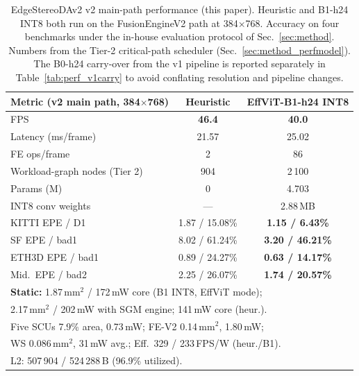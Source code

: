 \documentclass[journal]{IEEEtran}
\begin{document}
\begin{table}[tb]
\caption{EdgeStereoDAv2 v2 main-path performance (this paper). Heuristic and B1-h24 INT8 both run on the FusionEngineV2 path at 384$\times$768. Accuracy on four benchmarks under the in-house evaluation protocol of Sec.~\ref{sec:method}. Numbers from the Tier-2 critical-path scheduler (Sec.~\ref{sec:method_perfmodel}). The B0-h24 carry-over from the v1 pipeline is reported separately in Table~\ref{tab:perf_v1carry} to avoid conflating resolution and pipeline changes.}
\label{tab:perf}
\centering
\scriptsize
\setlength{\tabcolsep}{3pt}
\begin{tabular}{|l|c|c|}
\hline
\textbf{Metric (v2 main path, 384$\times$768)} & \textbf{Heuristic} & \textbf{EffViT-B1-h24 INT8} \\
\hline
FPS                 & \textbf{46.4}  & \textbf{40.0} \\
Latency (ms/frame)  & 21.57          & 25.02 \\
FE ops/frame        & 2              & 86 \\
Workload-graph nodes (Tier 2) & 904   & 2\,100 \\
Params (M)          & 0              & 4.703 \\
INT8 conv weights   & ---            & 2.88\,MB \\
\hline
KITTI EPE / D1      & 1.87 / 15.08\% & \textbf{1.15 / 6.43\%} \\
SF EPE / bad1       & 8.02 / 61.24\% & \textbf{3.20 / 46.21\%} \\
ETH3D EPE / bad1    & 0.89 / 24.27\% & \textbf{0.63 / 14.17\%} \\
Mid.\ EPE / bad2    & 2.25 / 26.07\% & \textbf{1.74 / 20.57\%} \\
\hline
\multicolumn{3}{|l|}{\textbf{Static:} 1.87\,mm$^2$ / 172\,mW core (B1 INT8, EffViT mode);} \\
\multicolumn{3}{|l|}{2.17\,mm$^2$ / 202\,mW with SGM engine; 141\,mW core (heur.).} \\
\multicolumn{3}{|l|}{Five SCUs 7.9\% area, 0.73\,mW; FE-V2 0.14\,mm$^2$, 1.80\,mW;} \\
\multicolumn{3}{|l|}{WS 0.086\,mm$^2$, 31\,mW avg.; Eff.\ 329 / 233\,FPS/W (heur./B1).} \\
\multicolumn{3}{|l|}{L2: 507\,904 / 524\,288\,B (96.9\% utilized).} \\
\hline
\end{tabular}
\end{table}
\end{document}
